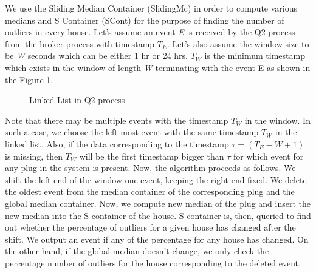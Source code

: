 We use the Sliding Median Container (SlidingMc) in order to compute various medians and S Container (SCont) for the purpose of finding the number of outliers in every house. Let's assume an event \textit{E} is received by the Q2 process from the broker process with timestamp \textit{$T_E$}. Let's also assume the window size to be \textit{W} seconds which can be either 1 hr or 24 hrs. \textit{$T_W$} is the minimum timestamp which exists in the window of length \textit{W} terminating with the event E as shown in the Figure \ref{fig:linked_list}.

\begin{figure}[h]
\begin{center}
\caption{Linked List in Q2 process \label{fig:linked_list}}
\end{center}
\end{figure}

Note that there may be multiple events with the timestamp $T_W$ in the window. In such a case, we choose the left most event with the same timestamp $T_W$ in the linked list. Also, if the data corresponding to the timestamp $\tau = (T_E - W +1)$ is missing, then $T_W$ will be the first timestamp bigger than $\tau$ for which event for any plug in the system is present. Now, the algorithm proceeds as follows. We shift the left end of the window one event, keeping the right end fixed. We delete the oldest event from the median container of the corresponding plug and the global median container. Now, we compute new median of the plug and insert the new median into the S container of the house. S container is, then, queried to find out whether the percentage of outliers for a given house has changed after the shift. We output an event if any of the percentage for any house has changed. On the other hand, if the global median doesn't change, we only check the percentage number of outliers for the house corresponding to the deleted event.

